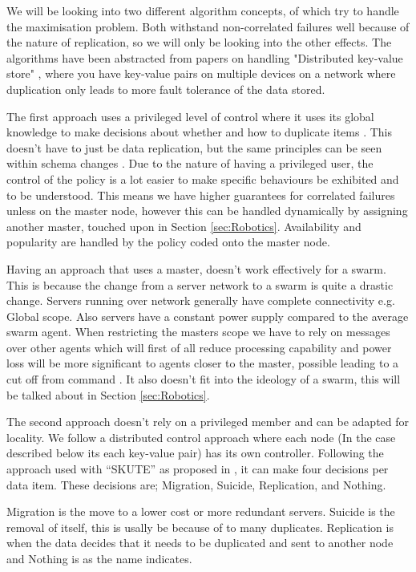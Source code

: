 \documentclass{UoYCSproject}
\begin{document}
We will be looking into two different algorithm concepts, of which try to handle the maximisation problem. 
Both withstand non-correlated failures well because of the nature of replication, so we will only be looking into the other effects. 
The algorithms have been abstracted from papers on handling "Distributed key-value store" \cite{Key-Value}, where you have key-value pairs on multiple devices on a network where duplication only leads to more fault tolerance of the data stored.

The first approach uses a privileged level of control where it uses its global knowledge to make decisions about whether and how to duplicate items \cite{Avalability storage, Patent}. 
This doesn’t have to just be data replication, but the same principles can be seen within schema changes \cite{Scheme changes}. 
Due to the nature of having a privileged user, the control of the policy is a lot easier to make specific behaviours be exhibited and to be understood. 
This means we have higher guarantees for correlated failures unless on the master node, however this can be handled dynamically by assigning another master, touched upon in Section \ref{sec:Robotics}. 
Availability and popularity are handled by the policy coded onto the master node.

Having an approach that uses a master, doesn’t work effectively for a swarm. 
This is because the change from a server network to a swarm is quite a drastic change. 
Servers running over network generally have complete connectivity e.g. Global scope. 
Also servers have a constant power supply compared to the average swarm agent. 
When restricting the masters scope we have to rely on messages over other agents which will first of all reduce processing capability and power loss will be more significant to agents closer to the master, possible leading to a cut off from command \cite{Swarm robotics reviewed}. 
It also doesn’t fit into the ideology of a swarm, this will be talked about in Section \ref{sec:Robotics}.

The second approach doesn’t rely on a privileged member and can be adapted for locality. 
We follow a distributed control approach where each node (In the case described below its each key-value pair) has its own controller. 
Following the approach used with “SKUTE” as proposed in \cite{Distributed Storage}, it can make four decisions per data item. 
These decisions are; Migration, Suicide, Replication, and Nothing.

Migration is the move to a lower cost or more redundant servers. 
Suicide is the removal of itself, this is usally be because of to many duplicates. 
Replication is when the data decides that it needs to be duplicated and sent to another node and Nothing is as the name indicates.
\end{document}
